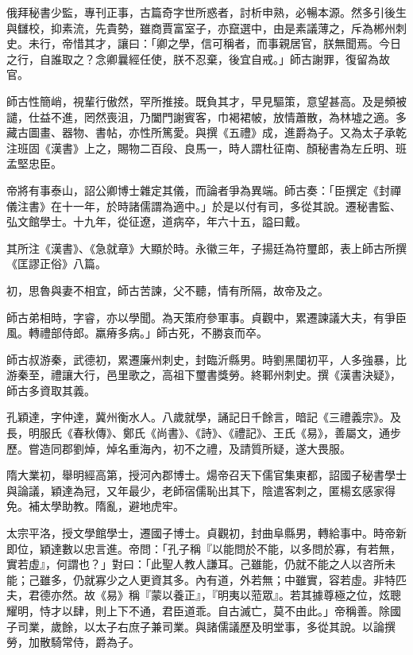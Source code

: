 \begin{pinyinscope}
 俄拜秘書少監，專刊正事，古篇奇字世所惑者，討析申熟，必暢本源。然多引後生與讎校，抑素流，先貴勢，雖商賈富室子，亦竄選中，由是素議薄之，斥為郴州刺史。未行，帝惜其才，讓曰：「卿之學，信可稱者，而事親居官，朕無聞焉。今日之行，自誰取之？念卿曩經任使，朕不忍棄，後宜自戒。」師古謝罪，復留為故官。



 師古性簡峭，視輩行傲然，罕所推接。既負其才，早見驅策，意望甚高。及是頻被譴，仕益不進，罔然喪沮，乃闔門謝賓客，巾褐裙帔，放情蕭散，為林墟之適。多藏古圖畫、器物、書帖，亦性所篤愛。與撰《五禮》成，進爵為子。又為太子承乾注班固《漢書》上之，賜物二百段、良馬一，時人謂杜征南、顏秘書為左丘明、班孟堅忠臣。



 帝將有事泰山，詔公卿博士雜定其儀，而論者爭為異端。師古奏：「臣撰定《封禪儀注書》在十一年，於時諸儒謂為適中。」於是以付有司，多從其說。遷秘書監、弘文館學士。十九年，從征遼，道病卒，年六十五，謚曰戴。



 其所注《漢書》、《急就章》大顯於時。永徽三年，子揚廷為符璽郎，表上師古所撰《匡謬正俗》八篇。



 初，思魯與妻不相宜，師古苦諫，父不聽，情有所隔，故帝及之。



 師古弟相時，字睿，亦以學聞。為天策府參軍事。貞觀中，累遷諫議大夫，有爭臣風。轉禮部侍郎。羸瘠多病。」師古死，不勝哀而卒。



 師古叔游秦，武德初，累遷廉州刺史，封臨沂縣男。時劉黑闥初平，人多強暴，比游秦至，禮讓大行，邑里歌之，高祖下璽書獎勞。終鄆州刺史。撰《漢書決疑》，師古多資取其義。



 孔穎達，字仲達，冀州衡水人。八歲就學，誦記日千餘言，暗記《三禮義宗》。及長，明服氏《春秋傳》、鄭氏《尚書》、《詩》、《禮記》、王氏《易》，善屬文，通步歷。嘗造同郡劉焯，焯名重海內，初不之禮，及請質所疑，遂大畏服。



 隋大業初，舉明經高第，授河內郡博士。煬帝召天下儒官集東都，詔國子秘書學士與論議，穎達為冠，又年最少，老師宿儒恥出其下，陰遣客刺之，匿楊玄感家得免。補太學助教。隋亂，避地虎牢。



 太宗平洛，授文學館學士，遷國子博士。貞觀初，封曲阜縣男，轉給事中。時帝新即位，穎達數以忠言進。帝問：「孔子稱『以能問於不能，以多問於寡，有若無，實若虛』，何謂也？」對曰：「此聖人教人謙耳。己雖能，仍就不能之人以咨所未能；己雖多，仍就寡少之人更資其多。內有道，外若無；中雖實，容若虛。非特匹夫，君德亦然。故《易》稱『蒙以養正』，『明夷以蒞眾』。若其據尊極之位，炫聰耀明，恃才以肆，則上下不通，君臣道乖。自古滅亡，莫不由此。」帝稱善。除國子司業，歲餘，以太子右庶子兼司業。與諸儒議歷及明堂事，多從其說。以論撰勞，加散騎常侍，爵為子。




\end{pinyinscope}

